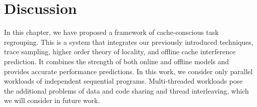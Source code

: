 \section{Discussion}
In this chapter, we have proposed a framework of cache-conscious task
regrouping. This is a system that integrates our previously introduced
techniques, trace sampling, higher order theory of locality, and
offline cache interference prediction. It combines the strength of
both online and offline models and provides accurate performance
predictions. In this work, we consider only parallel workloads of
independent sequential programs.  Multi-threaded workloads pose the
additional problems of data and code sharing and thread interleaving,
which we will consider in future work.  
